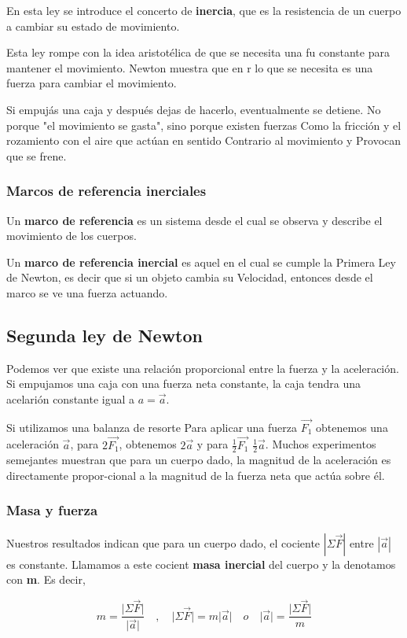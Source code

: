 \documentclass{article}
\newcommand{\newsubsection}[1]{
    \vspace{0.5cm}
    \color{sectionColor}
    \subsection{\bl{#1}}
    \color{black}
    \vspace{0.5cm}
}
\newcommand{\newtitle}[1]{
    \color{titleColor}
    \subsubsection{#1}
    \color{black}
}
\newcommand{\bl}[1]{\textbf{#1}}
\begin{document}
    \par En esta ley se introduce el concerto de \bl{inercia}, que es la resistencia de un cuerpo a cambiar su estado de movimiento.
    \par Esta ley rompe con la idea aristotélica de que se necesita una fu constante para mantener el movimiento. Newton muestra que en r lo que se necesita es una fuerza para cambiar el movimiento.
    \par Si empujás una caja y después dejas de hacerlo, eventualmente se detiene. No porque "el movimiento se gasta", sino porque existen fuerzas Como la fricción y el rozamiento con el aire que actúan en sentido Contrario al movimiento y Provocan que se frene.

    \newtitle{Marcos de referencia inerciales}

    \par Un \bl{marco de referencia} es un sistema desde el cual se observa y describe el movimiento de los cuerpos.
    \par Un \bl{marco de referencia inercial} es aquel en el cual se cumple la Primera Ley de Newton, es decir que si un objeto cambia su Velocidad, entonces desde el marco se ve una fuerza actuando.

    \newsubsection{Segunda ley de Newton}

    \par Podemos ver que existe una relación proporcional entre la fuerza y la aceleración. Si empujamos una caja con una fuerza neta constante, la caja tendra una acelarión constante igual a $a=\vec{a}$.
    \par Si utilizamos una balanza de resorte Para aplicar una fuerza $\vec{F_1}$ obtenemos una aceleración $\vec{a}$, para $2\vec{F_1}$, obtenemos $2\vec{a}$ y para $\frac{1}{2}\vec{F_1}$ $\frac{1}{2}\vec{a}$. Muchos experimentos semejantes muestran que para un cuerpo dado, la magnitud de la aceleración es directamente propor-cional a la magnitud de la fuerza neta que actúa sobre él.

    \newtitle{Masa y fuerza}

   \par Nuestros resultados indican que para un cuerpo dado, el cociente $\left\lvert \Sigma \vec{F}\right\rvert $ entre $\left\lvert \vec{a} \right\rvert $ es constante. Llamamos a este cocient \bl{masa inercial} del cuerpo y la denotamos con \bl{m}. Es decir,

    \[ m = \frac{\lvert \Sigma \vec{F}\rvert }{\lvert \vec{a} \rvert } \quad,\quad
    \lvert \Sigma \vec{F} \rvert = m \lvert \vec{a} \rvert \quad o \quad
    \lvert \vec{a} \rvert = \frac{\lvert \Sigma \vec{F}\rvert }{m}\]
\end{document}
